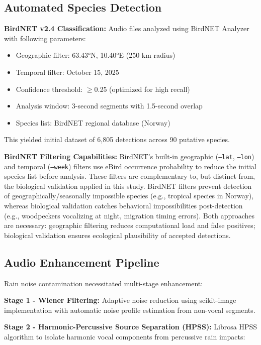 \documentclass[twocolumn]{article}
\begin{document}
\subsection{Automated Species Detection}

\textbf{BirdNET v2.4 Classification:} Audio files analyzed using BirdNET Analyzer \citep{Kahl2021} with following parameters:

\begin{itemize}
\item Geographic filter: 63.43°N, 10.40°E (250 km radius)
\item Temporal filter: October 15, 2025
\item Confidence threshold: $\geq$0.25 (optimized for high recall)
\item Analysis window: 3-second segments with 1.5-second overlap
\item Species list: BirdNET regional database (Norway)
\end{itemize}

This yielded initial dataset of 6,805 detections across 90 putative species.

\textbf{BirdNET Filtering Capabilities:} BirdNET's built-in geographic (\texttt{--lat}, \texttt{--lon}) and temporal (\texttt{--week}) filters use eBird occurrence probability to reduce the initial species list before analysis. These filters are complementary to, but distinct from, the biological validation applied in this study. BirdNET filters prevent detection of geographically/seasonally impossible species (e.g., tropical species in Norway), whereas biological validation catches behavioral impossibilities post-detection (e.g., woodpeckers vocalizing at night, migration timing errors). Both approaches are necessary: geographic filtering reduces computational load and false positives; biological validation ensures ecological plausibility of accepted detections.

\subsection{Audio Enhancement Pipeline}

Rain noise contamination necessitated multi-stage enhancement:

\textbf{Stage 1 - Wiener Filtering:} Adaptive noise reduction using scikit-image implementation with automatic noise profile estimation from non-vocal segments.

\textbf{Stage 2 - Harmonic-Percussive Source Separation (HPSS):} Librosa HPSS algorithm \citep{Fitzgerald2010} to isolate harmonic vocal components from percussive rain impacts:
\end{document}
